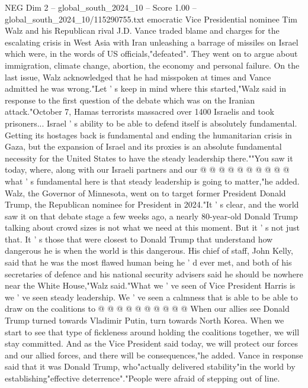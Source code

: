 \begin{textsample}{NEG Dim 2 – global\_south\_2024\_10 – Score 1.00 – global\_south\_2024\_10/115290755.txt}  \label{ex:f2_neg_315}
emocratic Vice Presidential nominee Tim Walz and his Republican rival J.D.
Vance traded blame and charges for the escalating crisis in West Asia with Iran unleashing a barrage of missiles on Israel which were, in the words of US officials,"defeated".
They went on to argue about immigration, climate change, abortion, the economy and personal failure.
On the last issue, Walz acknowledged that he had misspoken at times and Vance admitted he was wrong."Let ' s keep in mind where this started,"Walz said in response to the first question of the debate which was on the Iranian attack."October 7, Hamas terrorists massacred over 1400 Israelis and took prisoners...
Israel ' s ability to be able to defend itself is absolutely fundamental.
Getting its hostages back is fundamental and ending the humanitarian crisis in Gaza, but the expansion of Israel and its proxies is an absolute fundamental necessity for the United States to have the steady leadership there.""You saw it today, where, along with our Israeli partners and our @ @ @ @ @ @ @ @ @ @ what ' s fundamental here is that steady leadership is going to matter,"he added.
Walz, the Governor of Minnesota, went on to target former President Donald Trump, the Republican nominee for President in 2024."It ' s clear, and the world saw it on that debate stage a few weeks ago, a nearly 80-year-old Donald Trump talking about crowd sizes is not what we need at this moment.
But it ' s not just that.
It ' s those that were closest to Donald Trump that understand how dangerous he is when the world is this dangerous.
His chief of staff, John Kelly, said that he was the most flawed human being he ' d ever met, and both of his secretaries of defence and his national security advisers said he should be nowhere near the White House,"Walz said."What we ' ve seen of Vice President Harris is we ' ve seen steady leadership.
We ' ve seen a calmness that is able to be able to draw on the coalitions to @ @ @ @ @ @ @ @ @ @ When our allies see Donald Trump turned towards Vladimir Putin, turn towards North Korea.
When we start to see that type of fickleness around holding the coalitions together, we will stay committed.
And as the Vice President said today, we will protect our forces and our allied forces, and there will be consequences,"he added.
Vance in response said that it was Donald Trump, who"actually delivered stability"in the world by establishing"effective deterrence"."People were afraid of stepping out of line.

\end{textsample}
